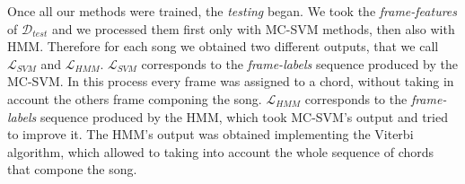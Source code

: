 %
Once all our methods were trained, the \textit{testing} began. We took the \textit{frame-features} of $\mathcal{D}_{test}$ and we processed them first only with MC-SVM methods, then also with HMM. Therefore for each song we obtained two different outputs, that we call $\mathcal{L}_{SVM}$ and $\mathcal{L}_{HMM}$. $\mathcal{L}_{SVM}$ corresponds to the \textit{frame-labels} sequence produced by the MC-SVM. In this process every frame was assigned to a chord, without taking in account the others frame componing the song.  $\mathcal{L}_{HMM}$ corresponds to the \textit{frame-labels} sequence produced by the HMM, which took MC-SVM's output and tried to improve it. The HMM's output was obtained implementing the Viterbi algorithm, which allowed to taking into account the whole sequence of chords that compone the song.

